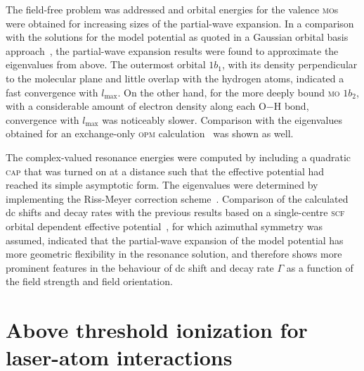 The field-free problem was addressed and orbital energies for the
valence \textsc{mo}s were obtained for increasing sizes of the
partial-wave expansion. In a comparison with the solutions for the
model potential as quoted in a Gaussian orbital basis
approach~\cite{illescas_2015}, the partial-wave expansion results were
found to approximate the eigenvalues from above. The outermost orbital
$1b_{1}$, with its density perpendicular to the molecular plane and
little overlap with the hydrogen atoms, indicated a fast convergence
with $l_{\mathrm{max}}$. On the other hand, for the more deeply bound
\textsc{mo} $1b_{2}$, with a considerable amount of electron density
along each O$-$H bond, convergence with $l_{\mathrm{max}}$ was
noticeably slower. Comparison with the eigenvalues obtained for an
exchange-only \textsc{opm} calculation~\cite{opm_2007} was shown as
well.

The complex-valued resonance energies were computed by including a
quadratic \textsc{cap} that was turned on at a distance such that the
effective potential had reached its simple asymptotic form. The
eigenvalues were determined by implementing the Riss-Meyer correction
scheme~\cite{RissMeyer_1993}. Comparison of the calculated dc shifts
and decay rates with the previous results based on a single-centre
\textsc{scf} orbital dependent effective
potential~\cite{sarias_2016,sarias_2017}, for which azimuthal symmetry
was assumed, indicated that the partial-wave expansion of the model
potential has more geometric flexibility in the resonance solution,
and therefore shows more prominent features in the behaviour of dc
shift and decay rate $\Gamma$ as a function of the field strength and
field orientation.










\section{Above threshold ionization for laser-atom interactions}
\label{ch:ati_results}


























































